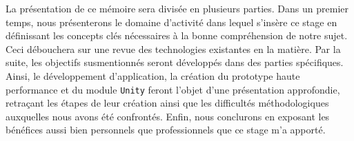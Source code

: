 La présentation de ce mémoire sera divisée en plusieurs parties. Dans un premier temps, nous présenterons le domaine d'activité dans lequel s'insère ce stage en définissant les concepts clés nécessaires à la bonne compréhension de notre sujet. Ceci débouchera sur une revue des technologies existantes en la matière. Par la suite, les objectifs susmentionnés seront développés dans des parties spécifiques. Ainsi, le développement d'application, la création du prototype haute performance et du module \texttt{Unity} feront l'objet d'une présentation approfondie, retraçant les étapes de leur création ainsi que les difficultés méthodologiques auxquelles nous avons été confrontés. Enfin, nous conclurons en exposant les bénéfices aussi bien personnels que professionnels que ce stage m'a apporté.